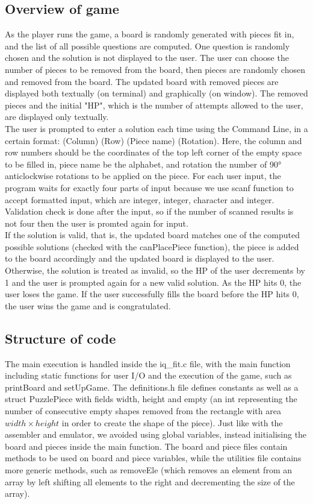 \documentclass{article}
\begin{document}
\subsection{Overview of game}
As the player runs the game, a board is randomly generated with pieces fit in, and the list of all possible questions are computed. One question is randomly chosen and the solution is not displayed to the user. The user can choose the number of pieces to be removed from the board, then pieces are randomly chosen and removed from the board. The updated board with removed pieces are displayed both textually (on terminal) and graphically (on window). The removed pieces and the initial "HP", which is the number of attempts allowed to the user, are displayed only textually. \\
The user is prompted to enter a solution each time using the Command Line, in a certain format: (Column) (Row) (Piece name) (Rotation). Here, the column and row numbers should be the coordinates of the top left corner of the empty space to be filled in, piece name be the alphabet, and rotation the number of 90° anticlockwise rotations to be applied on the piece. For each user input, the program waits for exactly four parts of input because we use scanf function to accept formatted input, which are integer, integer, character and integer. Validation check is done after the input, so if the number of scanned results is not four then the user is promted again for input. \\
If the solution is valid, that is, the updated board matches one of the computed possible solutions (checked with the canPlacePiece function), the piece is added to the board accordingly and the updated board is displayed to the user. Otherwise, the solution is treated as invalid, so the HP of the user decrements by 1 and the user is prompted again for a new valid solution. As the HP hits 0, the user loses the game. If the user successfully fills the board before the HP hits 0, the user wins the game and is congratulated. 

\subsection{Structure of code}

The main execution is handled inside the iq\_fit.c file, with the main function including static functions for user I/O and the execution of the game, such as printBoard and setUpGame. The definitions.h file defines constants as well as a struct PuzzlePiece with fields width, height and empty (an int representing the number of consecutive empty shapes removed from the rectangle with area $width \times height$ in order to create the shape of the piece). Just like with the assembler and emulator, we avoided using global variables, instead initialising the board and pieces inside the main function. The board and piece files contain methods to be used on board and piece variables, while the utilities file contains more generic methods, such as removeEle (which removes an element from an array by left shifting all elements to the right and decrementing the size of the array).
\end{document}
